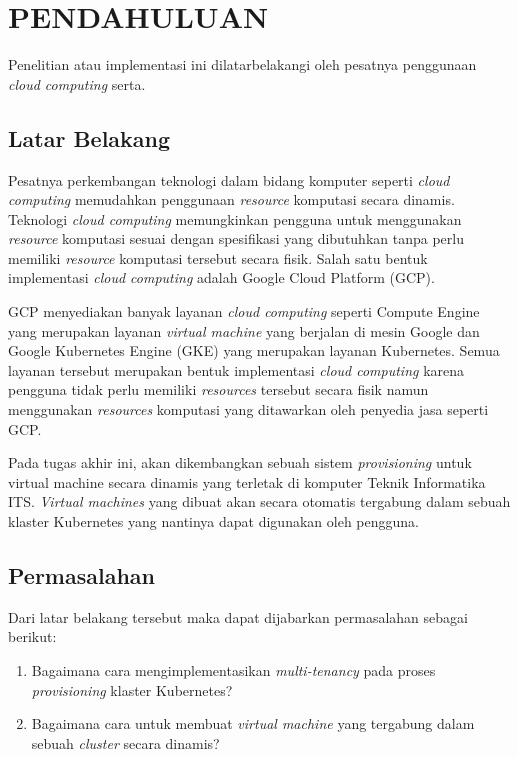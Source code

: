 \chapter{PENDAHULUAN}
\label{chap:pendahuluan}


Penelitian atau implementasi ini dilatarbelakangi oleh pesatnya
penggunaan \emph{cloud computing} serta.

\section{Latar Belakang}
\label{sec:latarbelakang}

Pesatnya perkembangan teknologi dalam bidang komputer
seperti \emph{cloud computing} memudahkan penggunaan \emph{resource}
komputasi secara dinamis. Teknologi \emph{cloud computing} memungkinkan
pengguna untuk menggunakan \emph{resource} komputasi sesuai dengan spesifikasi
yang dibutuhkan tanpa perlu memiliki \emph{resource} komputasi tersebut secara
fisik. Salah satu bentuk implementasi \emph{cloud computing} adalah
Google Cloud Platform (GCP).

GCP menyediakan banyak layanan \emph{cloud computing} seperti Compute Engine yang merupakan
layanan \emph{virtual machine} yang berjalan di mesin Google dan Google Kubernetes Engine (GKE)
yang merupakan layanan Kubernetes. Semua layanan tersebut merupakan bentuk implementasi
\emph{cloud computing} karena pengguna tidak perlu memiliki \emph{resources} tersebut secara
fisik namun menggunakan \emph{resources} komputasi yang ditawarkan oleh penyedia jasa seperti GCP.

Pada tugas akhir ini, akan dikembangkan sebuah sistem \emph{provisioning} untuk virtual machine
secara dinamis yang terletak di komputer Teknik Informatika ITS. \emph{Virtual machines}
yang dibuat akan secara otomatis tergabung dalam sebuah klaster Kubernetes yang nantinya
dapat digunakan oleh pengguna.

\section{Permasalahan}
\label{sec:permasalahan}

Dari latar belakang tersebut maka dapat dijabarkan permasalahan sebagai berikut:

\begin{enumerate}[nolistsep]

  \item Bagaimana cara mengimplementasikan \emph{multi-tenancy} pada proses \emph{provisioning}
    klaster Kubernetes?

  \item Bagaimana cara untuk membuat \emph{virtual machine} yang tergabung
    dalam sebuah \emph{cluster} secara dinamis?

\end{enumerate}

